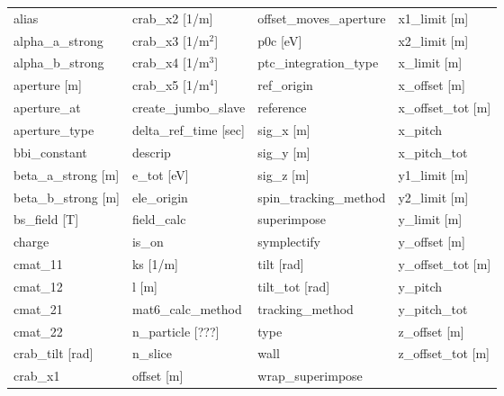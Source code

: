  \begin{tabular}{llll} \toprule
alias                            & crab_x2 [1/m]                    & offset_moves_aperture            & x1_limit [m]                     \\
alpha_a_strong                   & crab_x3 [1/m$^2$]                & p0c [eV]                         & x2_limit [m]                     \\
alpha_b_strong                   & crab_x4 [1/m$^3$]                & ptc_integration_type             & x_limit [m]                      \\
aperture [m]                     & crab_x5 [1/m$^4$]                & ref_origin                       & x_offset [m]                     \\
aperture_at                      & create_jumbo_slave               & reference                        & x_offset_tot [m]                 \\
aperture_type                    & delta_ref_time [sec]             & sig_x [m]                        & x_pitch                          \\
bbi_constant                     & descrip                          & sig_y [m]                        & x_pitch_tot                      \\
beta_a_strong [m]                & e_tot [eV]                       & sig_z [m]                        & y1_limit [m]                     \\
beta_b_strong [m]                & ele_origin                       & spin_tracking_method             & y2_limit [m]                     \\
bs_field [T]                     & field_calc                       & superimpose                      & y_limit [m]                      \\
charge                           & is_on                            & symplectify                      & y_offset [m]                     \\
cmat_11                          & ks [1/m]                         & tilt [rad]                       & y_offset_tot [m]                 \\
cmat_12                          & l [m]                            & tilt_tot [rad]                   & y_pitch                          \\
cmat_21                          & mat6_calc_method                 & tracking_method                  & y_pitch_tot                      \\
cmat_22                          & n_particle [???]                 & type                             & z_offset [m]                     \\
crab_tilt [rad]                  & n_slice                          & wall                             & z_offset_tot [m]                 \\
crab_x1                          & offset [m]                       & wrap_superimpose                 &                                  \\
 \bottomrule
 \end{tabular}
 \vfill
 
